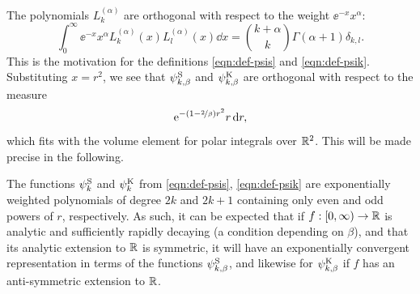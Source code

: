 The polynomials $L_k^{(\alpha)}$ are orthogonal with respect to the weight $\ee^{-x}x^\alpha$:
\begin{equation} \label{eqn:lag-orth}
    \int_0^\infty \ee^{-x}x^\alpha L^{(\alpha)}_k(x) L^{(\alpha)}_l(x) \dd x
    = \binom{k+\alpha}{k} \Gamma(\alpha + 1) \delta_{k,l}.
\end{equation}
This is the motivation for the definitions \eqref{eqn:def-psis} and \eqref{eqn:def-psik}. Substituting
$x=r^2$, we see that $\psi_{k,\beta}^{\mathrm{S}}$ and $\psi_{k,\beta}^{\mathrm{K}}$ are orthogonal with respect to the
measure
\[
    \mathrm{e}^{-(1-\nicefrac{2}{\beta})r^2} r \,\mathrm{d} r,
\]
which fits with the volume element for polar integrals over $\mathbb{R}^2$. This will be made precise in the
following.

The functions $\psi_k^{\mathrm{S}}$ and $\psi_k^{\mathrm{K}}$ from \eqref{eqn:def-psis}, \eqref{eqn:def-psik} are
exponentially weighted polynomials of degree $2k$ and $2k+1$ containing only even and odd powers of $r$,
respectively. As such, it can be expected that if $f : [0,\infty) \to \mathbb{R}$ is analytic and sufficiently rapidly
decaying (a condition depending on $\beta$), and that its analytic extension to $\mathbb{R}$ is symmetric, it will
have an exponentially convergent representation in terms of the functions $\psi_{k,\beta}^{\mathrm{S}}$, and likewise
for $\psi_{k,\beta}^{\mathrm{K}}$ if $f$ has an anti-symmetric extension to $\mathbb{R}$.

